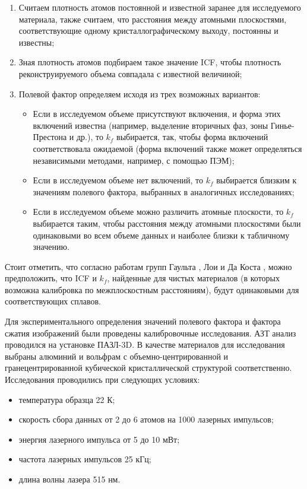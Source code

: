 \begin{enumerate}[beginpenalty=10000] %
	\item Считаем плотность атомов постоянной и известной заранее для исследуемого материала, также считаем, что расстояния между атомными плоскостями, соответствующие одному кристаллографическому выходу, постоянны и известны;
	\item Зная плотность атомов подбираем такое значение ICF, чтобы плотность реконструируемого объема совпадала с известной величиной;
	\item Полевой фактор определяем исходя из трех возможных вариантов:
	\begin{itemize} [beginpenalty=10000]
		\item Если в исследуемом объеме присутствуют включения, и форма этих включений известна (например, выделение вторичных фаз, зоны Гинье-Престона и др.), то $k_f$ выбирается, так, чтобы форма включений соответствовала ожидаемой (форма включений также может определяться независимыми методами, например, с помощью ПЭМ);
		\item Если в исследуемом объеме нет включений, то $k_f$ выбирается близким к значениям полевого фактора, выбранных в аналогичных исследованиях;
		\item Если в исследуемом объеме можно различить атомные плоскости, то $k_f$ выбирается таким, чтобы расстояния между атомными плоскостями были одинаковыми во всем объеме данных и наиболее близки к табличному значению.
	\end{itemize}
\end{enumerate}

Стоит отметить, что согласно работам групп Гаульта \cite{Gault11_Loi}, Лои \cite{Loi13} и Да Коста \cite{Hatzoglou19}, можно предположить, что ICF и $k_f$, найденные для чистых материалов (в которых возможна калибровка по межплоскостным расстояниям), будут одинаковыми для соответствующих сплавов.

Для экспериментального определения значений полевого фактора и фактора сжатия изображений были проведены калибровочные исследования. АЗТ анализ проводился на установке ПАЗЛ-3D. В качестве материалов для исследования выбраны алюминий и вольфрам с объемно-центрированной и гранецентрированной кубической кристаллической структурой соответственно. Исследования проводились при следующих условиях:
\begin{itemize}
	\item температура образца 22 К;
	\item скорость сбора данных от 2 до 6 атомов на 1000 лазерных импульсов;
	\item энергия лазерного импульса от 5 до 10 мВт;
	\item частота лазерных импульсов 25 кГц;
	\item длина волны лазера 515 нм.
\end{itemize} 

